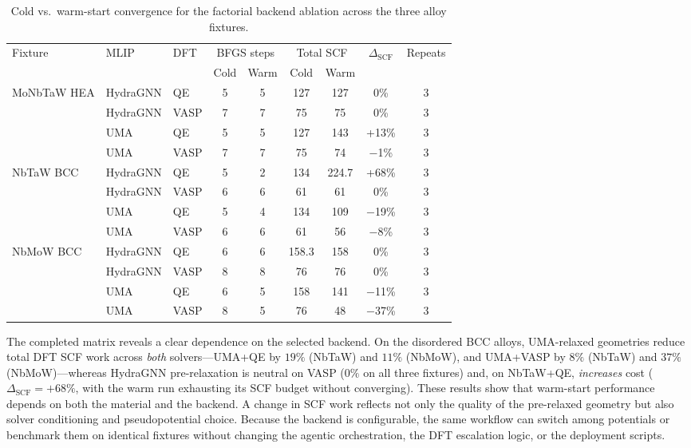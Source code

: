 \documentclass[11pt,a4paper]{article}
\def\ac#1{#1}%
\def\acs#1{#1}%
\begin{document}
\begin{table}[tp]
\centering
\caption{Cold vs.\ warm-start convergence for the factorial backend ablation
across the three alloy fixtures.}
\label{tab:warmstart_matrix}
\begin{tabular}{lllcccccc}
\toprule
\multirow{2}{*}{Fixture} & \multirow{2}{*}{\acs{MLIP}} & \multirow{2}{*}{\acs{DFT}}
 & \multicolumn{2}{c}{\acs{BFGS} steps} & \multicolumn{2}{c}{Total \acs{SCF}} & \multirow{2}{*}{$\Delta_\text{SCF}$} & \multirow{2}{*}{Repeats}\\
\cmidrule(lr){4-5}\cmidrule(lr){6-7}
 & & & Cold & Warm & Cold & Warm & & \\
\midrule
\multirow{4}{*}{MoNbTaW \acs{HEA}} & HydraGNN & \acs{QE} & 5 & 5 & 127 & 127 & 0\% & 3 \\
 & HydraGNN & \acs{VASP} & 7 & 7 & 75 & 75 & 0\% & 3 \\
 & UMA & \acs{QE} & 5 & 5 & 127 & 143 & +13\% & 3 \\
 & UMA & \acs{VASP} & 7 & 7 & 75 & 74 & $-$1\% & 3 \\
\cmidrule(lr){1-9}
\multirow{4}{*}{NbTaW BCC} & HydraGNN & \acs{QE} & 5 & 2 & 134 & 224.7 & +68\% & 3 \\
 & HydraGNN & \acs{VASP} & 6 & 6 & 61 & 61 & 0\% & 3 \\
 & UMA & \acs{QE} & 5 & 4 & 134 & 109 & $-$19\% & 3 \\
 & UMA & \acs{VASP} & 6 & 6 & 61 & 56 & $-$8\% & 3 \\
\cmidrule(lr){1-9}
\multirow{4}{*}{NbMoW BCC} & HydraGNN & \acs{QE} & 6 & 6 & 158.3 & 158 & 0\% & 3 \\
 & HydraGNN & \acs{VASP} & 8 & 8 & 76 & 76 & 0\% & 3 \\
 & UMA & \acs{QE} & 6 & 5 & 158 & 141 & $-$11\% & 3 \\
 & UMA & \acs{VASP} & 8 & 5 & 76 & 48 & $-$37\% & 3 \\
\bottomrule
\end{tabular}
\end{table}

The completed matrix reveals a clear dependence on the selected backend. On the disordered \ac{BCC}
alloys, UMA-relaxed geometries reduce total \ac{DFT} \ac{SCF} work across
\emph{both} solvers---UMA+\ac{QE} by $19\%$ (NbTaW) and $11\%$ (NbMoW), and
UMA+\ac{VASP} by $8\%$ (NbTaW) and $37\%$ (NbMoW)---whereas HydraGNN
pre-relaxation is neutral on \ac{VASP} ($0\%$ on all three fixtures) and, on
NbTaW+\ac{QE}, \emph{increases} cost ($\Delta_\text{SCF}=+68\%$, with the warm
run exhausting its \ac{SCF} budget without converging). These results show that warm-start performance depends on both the material and the
backend. A change in \ac{SCF} work reflects not only the quality of the
pre-relaxed geometry but also solver conditioning and pseudopotential choice. Because the backend is configurable, the same workflow can switch among potentials or benchmark them on identical fixtures without changing the agentic
orchestration, the \ac{DFT} escalation logic, or the deployment scripts.
\end{document}

